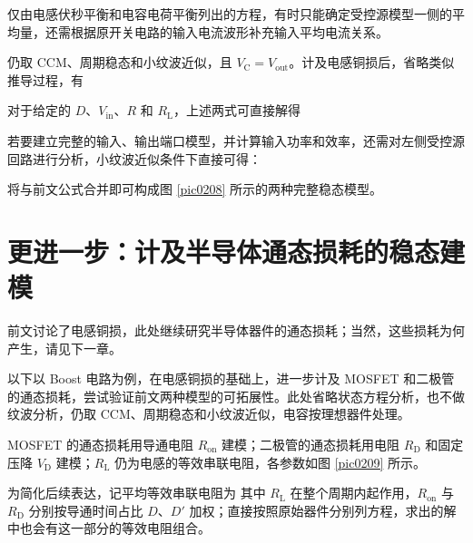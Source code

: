 仅由电感伏秒平衡和电容电荷平衡列出的方程，有时只能确定受控源模型一侧的平均量，还需根据原开关电路的输入电流波形补充输入平均电流关系。




仍取 CCM、周期稳态和小纹波近似，且 $V_{\mathrm{C}}=V_{\mathrm{out}}$。计及电感铜损后，省略类似推导过程，有

对于给定的 $D$、$V_{\mathrm{in}}$、$R$ 和 $R_{\mathrm{L}}$，上述两式可直接解得

若要建立完整的输入、输出端口模型，并计算输入功率和效率，还需对左侧受控源回路进行分析，小纹波近似条件下直接可得：

将与前文公式合并即可构成图 \ref{pic0208} 所示的两种完整稳态模型。

\newpage{}

\section{更进一步：计及半导体通态损耗的稳态建模}

前文讨论了电感铜损，此处继续研究半导体器件的通态损耗；当然，这些损耗为何产生，请见下一章。


以下以 Boost 电路为例，在电感铜损的基础上，进一步计及 MOSFET 和二极管的通态损耗，尝试验证前文两种模型的可拓展性。此处省略状态方程分析，也不做纹波分析，仍取 CCM、周期稳态和小纹波近似，电容按理想器件处理。


MOSFET 的通态损耗用导通电阻 $R_{\mathrm{on}}$ 建模；二极管的通态损耗用电阻 $R_{\mathrm{D}}$ 和固定压降 $V_{\mathrm{D}}$ 建模；$R_{\mathrm{L}}$ 仍为电感的等效串联电阻，各参数如图 \ref{pic0209} 所示。

\vspace{-0.4cm}


为简化后续表达，记平均等效串联电阻为
其中 $R_{\mathrm{L}}$ 在整个周期内起作用，$R_{\mathrm{on}}$ 与 $R_{\mathrm{D}}$ 分别按导通时间占比 $D$、$D'$ 加权；直接按照原始器件分别列方程，求出的解中也会有这一部分的等效电阻组合。

